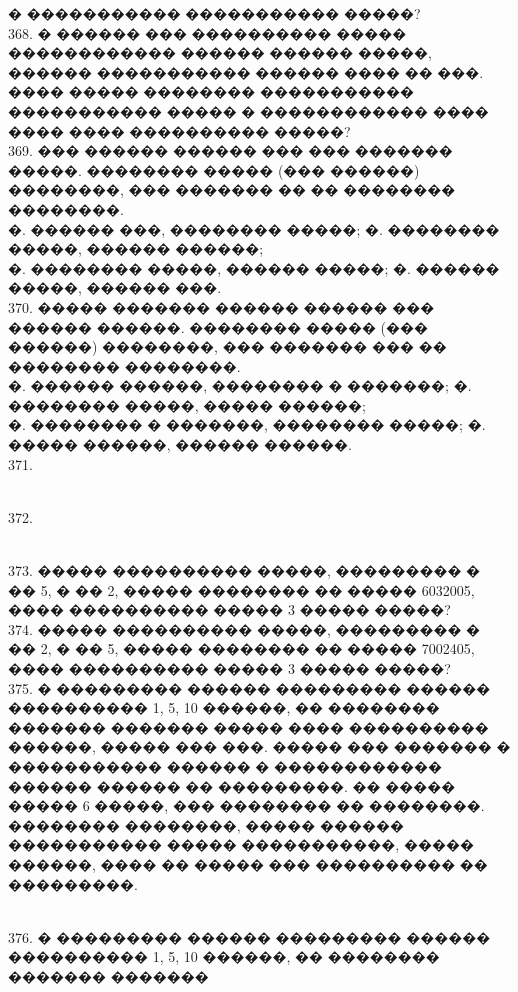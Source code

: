 \documentclass[12pt]{article}
\begin{document}
� ����������� ����������� �����?\\
368. � ������ ��� ���������� ����� ������������ ������ ������ �����, ������ ����������� ������ ���� �� ���. ���� ����� �������� �����������
����������� ����� � ������������ ���� ���� ���� ���������� �����?\\
369. ��� ������ ������ ��� ��� ������� �����. �������� ����� (��� ������) ��������, ��� ������� �� �� �������� ��������.\\
�. ������ ���, �������� �����;  \qquad \qquad �. �������� �����, ������ ������;\\
�. �������� �����, ������ �����; \qquad \quad �. ������ �����, ������ ���.\\
370. ����� ������� ������ ������ ��� ������ ������. �������� ����� (��� ������) ��������, ��� ������� ��� �� �������� ��������.\\
�. ������ ������, �������� � �������;  \qquad \quad �. �������� �����, ����� ������;\\
�. �������� � �������, �������� �����; \qquad  �. ����� ������, ������ ������.\\
371. \begin{figure}[ht!]
\end{figure}\\
372. \begin{figure}[ht!]
\end{figure}\\
373. ����� ���������� �����, ��������� � �� 5, � �� 2, ����� �������� �� ����� 6032005, ����
���������� ����� 3 ����� �����?\\
374. ����� ���������� �����, ��������� � �� 2, � �� 5, ����� �������� �� ����� 7002405, ����
���������� ����� 3 ����� �����?\\
375. � ��������� ������ ��������� ������ ���������� 1, 5, 10 ������, �� �������� ������� �������
����� ���� ���������� ������, ����� ��� ���. ����� ��� ������� � ����������� ������ �
������������ ������ ������ �� ���������. �� ����� ����� 6 �����, ��� �������� �� ��������.
�������� ��������, ����� ������ ����������� ����� �����������, ����� ������, ���� �� ����� ���
���������� �� ���������.\\
\begin{figure}[ht!]
\end{figure}\\
376. � ��������� ������ ��������� ������ ���������� 1, 5, 10 ������, �� �������� ������� �������
\end{document}
